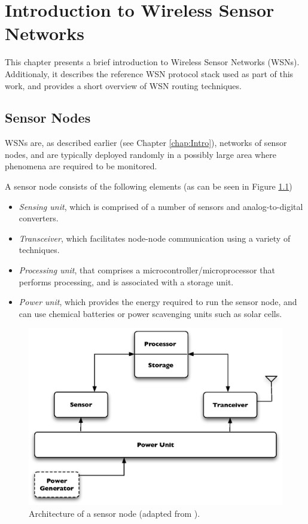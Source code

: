 \chapter{Introduction to Wireless Sensor Networks} \label{chap:IntroWSN}
This chapter presents a brief introduction to Wireless Sensor Networks (WSNs).
Additionaly, it describes the reference WSN protocol stack used as part of this
work, and provides a short overview of WSN routing techniques.

\section{Sensor Nodes} \label{subsec:sensornodes}
WSNs are, as described earlier (see Chapter \ref{chap:Intro}), networks of sensor
nodes, and are typically deployed randomly in a possibly large area where
phenomena are required to be monitored.

A sensor node consists of the following elements (as can be seen
in Figure \ref{Fig:SensorNodeArch})
\begin{itemize}
  \item \emph{Sensing unit}, which is comprised of a number of sensors and
  analog-to-digital converters. 
  \item \emph{Transceiver}, which facilitates node-node communication using 
a variety of techniques.
  \item \emph{Processing unit}, that comprises a 
microcontroller/microprocessor that performs processing, and is associated with 
a storage unit.
  \item \emph{Power unit}, which provides the energy required to run the sensor node, and can use chemical 
batteries or power scavenging units such as solar cells.
\end{itemize}

\begin{figure}[h]
\centering
\includegraphics[scale=0.65]{img/SensorNodeArch.eps} 
\caption[Architecture of a sensor node] {Architecture of a sensor node (adapted from \cite{SensorSurveyAkyildiz:2002}).}
\label{Fig:SensorNodeArch}
\end{figure} 

